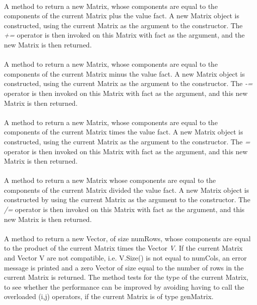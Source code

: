  \\
A method to return a new Matrix, whose components are equal to the
components of the current Matrix plus the value \p fact. A new
Matrix object is constructed, using the current Matrix as the
argument to the constructor. The {\em +=} operator is then invoked 
on this Matrix with \p fact as the argument, and the new Matrix is
then returned. \\ 

 \\
A method to return a new Matrix, whose components are equal to the
components of the current Matrix minus the value \p fact. A new
Matrix object is constructed, using the current Matrix as the
argument to the constructor. The {\em -=} operator is then invoked 
on this Matrix with \p fact as the argument, and this new Matrix is
then returned. \\ 


 \\
A method to return a new Matrix, whose components are equal to the
components of the current Matrix times the value \p fact. A new
Matrix object is constructed, using the current Matrix as the
argument to the constructor. The {\em *=} operator is then invoked 
on this Matrix with \p fact as the argument, and this new Matrix is
then returned. \\ 

 \\
A method to return a new Matrix whose components are equal to the
components of the current Matrix divided the value \p fact. A new
Matrix object is constructed by using the current Matrix as the
argument to the constructor. The {\em /=} operator is then invoked 
on this Matrix with \p fact as the argument, and this new Matrix is
then returned. \\ 

 \\
A method to return a new Vector, of size numRows, whose components are
equal to the product of the current Matrix times the Vector {\em
V}. If the current Matrix and Vector \p V are not compatible,
i.e. V.Size() is not equal to numCols, an error message is printed and 
a zero Vector of size equal to the number of rows in the current
Matrix is returned. The method tests for the type of the current
Matrix, to see whether the performance can be improved by avoiding
having to call the overloaded (i,j) operators, if the current Matrix
is of type genMatrix. \\ 

